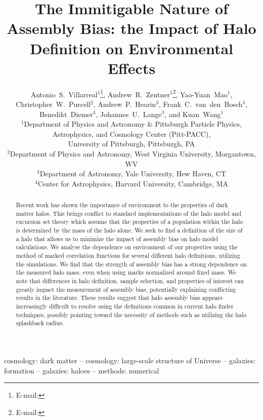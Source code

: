 \documentclass[usenatbib,fleqn]{mnras}
\title[The Immitigable Nature of Assembly Bias]{The Immitigable Nature of Assembly
Bias: the Impact of Halo Definition on Environmental Effects}
\author[A.~S.~Villarreal et al.]{%
Antonio~S.~Villarreal$^{1}$\thanks{E-mail: \email{asv13@pitt.edu}},
Andrew~R.~Zentner$^{1}$\thanks{E-mail: \email{zentner@pitt.edu}},
Yao-Yuan~Mao$^{1}$, %
Christopher~W.~Purcell$^{2}$,%
\newauthor
Andrew~P.~Hearin$^{3}$, %
Frank~C.~van~den~Bosch$^{3}$, %
Benedikt~Diemer$^{4}$, %
Johannes~U.~Lange$^{3}$,
\newauthor
and Kuan~Wang$^{1}$
\\
$^{1}$Department of Physics and Astronomy \& Pittsburgh Particle Physics, Astrophysics, and Cosmology Center (Pitt-PACC), \\
\phantom{$^{1}$}University of Pittsburgh, Pittsburgh, PA\\
$^{2}$Department of Physics and Astronomy, West Virginia University, Morgantown, WV \\
$^{3}$Department of Astronomy, Yale University, Hew Haven, CT\\
$^{4}$Center for Astrophysics, Harvard University, Cambridge, MA}
\begin{document}
\label{firstpage}
\pagerange{\pageref{firstpage}--\pageref{lastpage}} 

\maketitle

\begin{abstract}

Recent work has shown the importance of environment to the properties of dark matter halos. This brings conflict
to standard implementations of the halo model and excursion set theory which assume that the properties of a
population within the halo is determined by the mass of the halo alone. We seek to find a definition of the size
of a halo that allows us to minimize the impact of assembly bias on halo model calculations. We analyse the
dependence on environment of our properties using the method of marked correlation functions for several
different halo definitions, utilizing the \citet{diemer_kravtsov15} simulations. We find that the strength of assembly
bias has a strong dependence on the measured halo mass, even when using marks normalized around fixed mass. We note that differences in halo definition, sample selection, and properties of interest can greatly impact
the measurement of assembly bias, potentially explaining conflicting results in the literature. These results suggest that
halo assembly bias appears increasingly difficult to resolve using the definitions common in current halo finder techniques,
possibly pointing toward the necessity of methods such as utilizing the halo splashback radius.

\end{abstract}

\begin{keywords}
cosmology: dark matter -- cosmology: large-scale structure of Universe -- galaxies: formation -- galaxies: haloes -- methods: numerical
\end{keywords}
\end{document}
